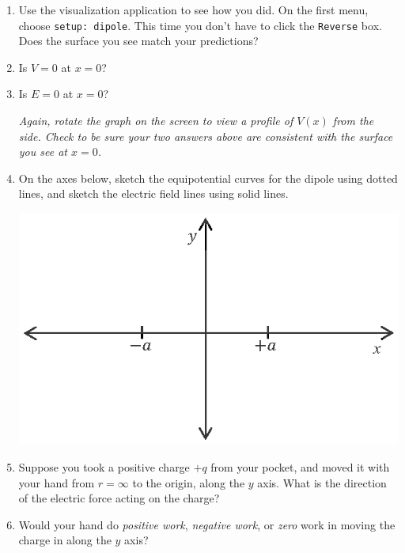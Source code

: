 \begin{enumerate}[wide, label=(\emph{\alph*})]
\item Use the visualization application to see how you did.  On the first menu, choose \verb!setup: dipole!.  This time you don't have to click the \verb!Reverse! box.  Does the surface you see match your predictions?
\answerspace{0.3in}

\item Is $V=0$ at $x=0$?
\answerspace{0.3in}

\item Is $E=0$ at $x=0$?
\answerspace{0.3in}

\textit{Again, rotate the graph on the screen to view a profile of $V(x)$ from the side.  Check to be sure your two answers above are consistent with the surface you see at $x=0$.}

\item On the axes below, sketch the equipotential curves for the dipole using dotted lines, and sketch the electric field lines using solid lines.
\begin{center}
\includegraphics{potential_superposition/activity_2_3_figs/x_y_axes.eps}
\end{center}

\item Suppose you took a positive charge $+q$ from your pocket, and moved it with your hand from $r=\infty$ to the origin, along the $y$ axis.  What is the direction of the electric force acting on the charge?
\answerspace{0.3in}

\item Would your hand do \textit{positive work}, \textit{negative work}, or \textit{zero} work in moving the charge in along the $y$ axis?
\answerspace{0.3in}
\end{enumerate}
